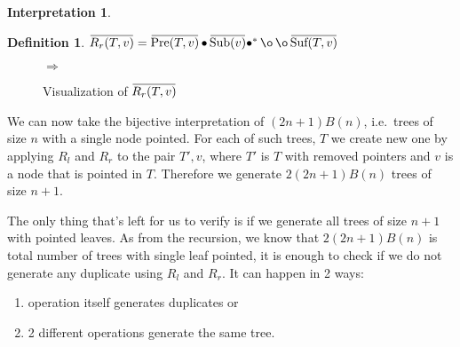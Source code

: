 \documentclass[final]{article}
\theoremstyle{definition}
\newtheorem{definition}{Definition}[subsection]
\theoremstyle{definition}
\newtheorem{interpretation}{Interpretation}[subsection]
\theoremstyle{remark}
\newcommand{\ols}[1]{\mskip.5\thinmuskip\overline{\mskip-.5\thinmuskip {#1} \mskip-.5\thinmuskip}\mskip.5\thinmuskip} %
\newcommand{\enc}[1]{\ensuremath{\ols{#1}}}
\newcommand{\pointed}[1]{\ensuremath{{#1}^*}}
\DeclareMathOperator{\tSub}{\text{Sub}}
\DeclareMathOperator{\tPre}{\text{Pre}}
\DeclareMathOperator{\tSuf}{\text{Suf}}
\DeclareMathOperator{\n}{\bullet}
\DeclareMathOperator{\no}{\o}
\begin{document}
\begin{interpretation}
\begin{definition}
    \(\enc{R_r(T, v)} = \enc{\tPre(T, v)} \n \enc{\tSub(v)} \pointed{\n} \no \no \enc{\tSuf(T, v)} \)
\end{definition}

\begin{figure}[H]
    \centering
    \begin{minipage}{.25\textwidth}\end{minipage}%
    \(\Rightarrow\)
    \begin{minipage}{.4\textwidth}\end{minipage}%
    \caption{Visualization of \(\enc{R_r(T, v)}\)}
    \label{fig:remy_right}
\end{figure}

We can now take the bijective interpretation of \((2n + 1) B(n)\), i.e.\ trees of size \(n\) with a single node pointed. For each of such trees, \(T\) we create new one by applying \(R_l\) and \(R_r\) to the pair \(T', v\), where \(T'\) is \(T\) with removed pointers and \(v\) is a node that is pointed in \(T\). Therefore we generate \(2(2n + 1) B(n)\) trees of size \(n + 1\).

The only thing that's left for us to verify is if we generate all trees of size \(n + 1\) with pointed leaves. As from the recursion, we know that \(2 (2n + 1) B(n)\) is total number of trees with single leaf pointed, it is enough to check if we do not generate any duplicate using \(R_l\) and \(R_r\). It can happen in 2 ways:
\begin{enumerate}
    \item operation itself generates duplicates or
    \item 2 different operations generate the same tree.
\end{enumerate}


\end{interpretation}
\end{document}
